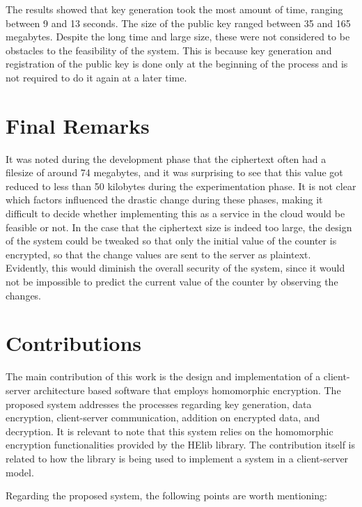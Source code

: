 The results showed that key generation took the most amount of time, ranging between 9 and 13 seconds. The size of the public key ranged between 35 and 165 megabytes. Despite the long time and large size, these were not considered to be obstacles to the feasibility of the system. This is because key generation and registration of the public key is done only at the beginning of the process and is not required to do it again at a later time.

\section{Final Remarks}

It was noted during the development phase that the ciphertext often had a filesize of around 74 megabytes, and it was surprising to see that this value got reduced to less than 50 kilobytes during the experimentation phase. It is not clear which factors influenced the drastic change during these phases, making it difficult to decide whether implementing this as a service in the cloud would be feasible or not. In the case that the ciphertext size is indeed too large, the design of the system could be tweaked so that only the initial value of the counter is encrypted, so that the change values are sent to the server as plaintext. Evidently, this would diminish the overall security of the system, since it would not be impossible to predict the current value of the counter by observing the changes. 

\section{Contributions}

The main contribution of this work is the design and implementation of a client-server architecture based software that employs homomorphic encryption. The proposed system addresses the processes regarding key generation, data encryption, client-server communication, addition on encrypted data, and decryption. It is relevant to note that this system relies on the homomorphic encryption functionalities provided by the HElib library. The contribution itself is related to how the library is being used to implement a system in a client-server model.

Regarding the proposed system, the following points are worth mentioning:

